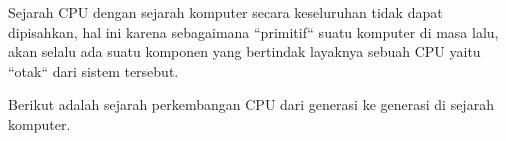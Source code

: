Sejarah CPU dengan sejarah komputer secara keseluruhan tidak dapat dipisahkan,
hal ini karena sebagaimana ``primitif`` suatu komputer di masa lalu, akan selalu
ada suatu komponen yang bertindak layaknya sebuah CPU yaitu ``otak`` dari sistem
tersebut.

Berikut adalah sejarah perkembangan CPU dari generasi ke generasi di sejarah komputer.
